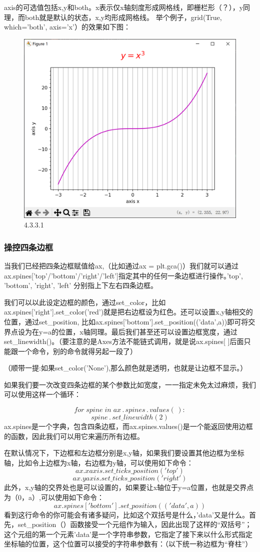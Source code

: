 \documentclass[12pt]{article}
\begin{document}
axis的可选值包括x,y和both。x表示仅x轴刻度形成网格线，即栅栏形（？），y同理，而both就是默认的状态，x,y均形成网格线。
举个例子，grid(True, which='both', axis='x'）的效果如下图：
\begin{figure}[H]
    \centering
    \includegraphics[width=0.5\linewidth]{grid Pic1.png}
    \caption{4.3.3.1}
    \label{fig:enter-label}
\end{figure}
\subsubsection{操控四条边框}
当我们已经把四条边框赋值给ax,（比如通过ax = plt.gca()）我们就可以通过ax.spines['top'/'bottom'/'right'/'left']指定其中的任何一条边框进行操作。'top', 'bottom', 'right', 'left' 分别指上下左右四条边框。

我们可以以此设定边框的颜色，通过set\_color，比如ax.spines['right'].set\_color('red')就是把右边框设为红色。还可以设置x,y轴相交的位置，通过set\_position, 比如ax.spines['bottom'].set\_position(('data',a))即可将交界点设为在y=a的位置，x轴同理。最后我们甚至还可以设置边框宽度，通过set\_linewidth()。（要注意的是Axes方法不能链式调用，就是说ax.spines[ ]后面只能跟一个命令，别的命令就得另起一段了）

（顺带一提:如果set\_color('None'),那么颜色就是透明，也就是让边框不显示。）

如果我们要一次改变四条边框的某个参数比如宽度，一一指定未免太过麻烦，我们可以使用这样一个循环：

\[for\; spine\; in\; ax\,.\,spines\,.\,values(\,):\]
\[spine\,.\,set\_linewidth(2)\]
ax.spines是一个字典，包含四条边框，而ax.spines.values()是一个能返回使用边框的函数，因此我们可以用它来遍历所有边框。

在默认情况下，下边框和左边框分别是x,y轴，如果我们要设置其他边框为坐标轴，比如令上边框为x轴，右边框为y轴，可以使用如下命令：
\[ax.xaxis.set\_ticks\_position('top')\]
\[ax.yaxis.set\_ticks\_position('right')\]
此外，x,y轴的交界处也是可以设置的，如果要让x轴位于y=a位置，也就是交界点为（0，a）,可以使用如下命令：
\[ax.spines['bottom'].set\_position(('data',a))\]
看到这行命令的你可能会有诸多疑问，比如这个双括号是什么，'data'又是什么。首先，set\_position（）函数接受一个元组作为输入，因此出现了这样的“双括号”；这个元组的第一个元素'data'是一个字符串参数，它指定了接下来以什么形式指定坐标轴的位置，这个位置可以接受的字符串参数有：（以下统一称边框为“脊柱”）
\end{document}
